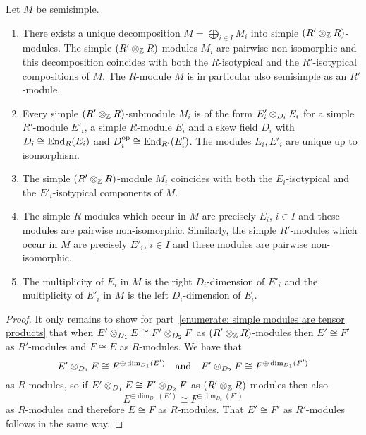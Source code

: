 \begin{theorem}
  \label{theorem: canonical decomposition of ss module}
  Let $M$ be semisimple.
  \begin{enumerate}
    \item
      There exists a unique decomposition $M  = \bigoplus_{i \in I} M_i$ into simple $(R' \mathbin{\otimes}_{\mathbb{Z}} R)$-modules.
      The simple $(R' \mathbin{\otimes}_{\mathbb{Z}} R)$-modules $M_i$ are pairwise non-isomorphic and this decomposition coincides with both the $R$-isotypical and the $R'$-isotypical compositions of $M$.
      The $R$-module $M$ is in particular also semisimple as an $R'$-module.
    \item
      \label{enumerate: simple modules are tensor products}
      Every simple $(R' \mathbin{\otimes}_{\mathbb{Z}} R)$-submodule $M_i$ is of the form $E'_i \mathbin{\otimes}_{D_i} E_i$ for a simple $R'$-module $E'_i$, a simple $R$-module $E_i$ and a skew field $D_i$ with $D_i \cong \operatorname{End}_R(E_i)$ and $D_i^{\operatorname{op}} \cong \operatorname{End}_{R'}(E'_i)$.
      The modules $E_i, E'_i$ are unique up to isomorphism.
    \item
      The simple $(R' \mathbin{\otimes}_{\mathbb{Z}} R)$-module $M_i$ coincides with both the $E_i$-isotypical and the $E'_i$-isotypical components of $M$.
    \item
      The simple $R$-modules which occur in $M$ are precisely $E_i$, $i \in I$ and these modules are pairwise non-isomorphic.
      Similarly, the simple $R'$-modules which occur in $M$ are precisely $E'_i$, $i \in I$ and these modules are pairwise non-isomorphic.
    \item
      The multiplicity of $E_i$ in $M$ is the right $D_i$-dimension of $E'_i$ and the multiplicity of $E'_i$ in $M$ is the left $D_i$-dimension of $E_i$.
  \end{enumerate}
\end{theorem}


\begin{proof}
  It only remains to show for part~\ref*{enumerate: simple modules are tensor products} that when $E' \mathbin{\otimes}_{D_1} E \cong F' \mathbin{\otimes}_{D_2} F$ as $(R' \mathbin{\otimes}_{\mathbb{Z}} R)$-modules then $E' \cong F'$ as $R'$-modules and $F \cong E$ as $R$-modules.
  We have that
  \[
          E' \mathbin{\otimes}_{D_1} E
    \cong E^{\oplus \dim_{D_1}(E')}
    \quad\text{and}\quad
          F' \mathbin{\otimes}_{D_2} F
    \cong F^{\oplus \dim_{D_1}(F')}
  \]
  as $R$-modules, so if $E' \mathbin{\otimes}_{D_1} E \cong F' \mathbin{\otimes}_{D_2} F$ as $(R' \mathbin{\otimes}_{\mathbb{Z}} R)$-modules then also
  \[
          E^{\oplus \dim_{D_1}(E')}
    \cong F^{\oplus \dim_{D_2}(F')}
  \]
  as $R$-modules and therefore $E \cong F$ as $R$-modules.
  That $E' \cong F'$ as $R'$-modules follows in the same way.
\end{proof}


